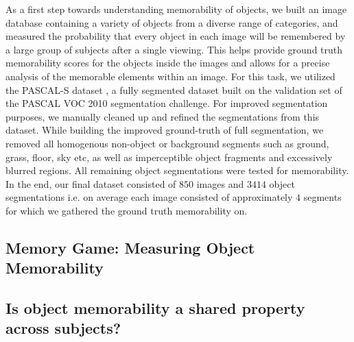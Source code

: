 As a first step towards understanding memorability of objects, we built an image database containing a variety of objects from a diverse range of categories, and measured the probability that every object in each image will be remembered by a large group of subjects after a single viewing. This helps provide ground truth memorability scores for the objects inside the images and allows for a precise analysis of the memorable elements within an image. For this task, we utilized the PASCAL-S dataset \cite{yin14}, a fully segmented dataset built on the validation set of the PASCAL VOC 2010 \cite{pascal10} segmentation challenge. For improved segmentation purposes, we manually cleaned up and refined the segmentations from this dataset. While building the improved ground-truth of full segmentation, we removed all homogenous non-object or background segments such as ground, grass, floor, sky etc, as well as imperceptible object fragments and excessively blurred regions. All remaining object segmentations were tested for memorability. In the end, our final dataset consisted of $850$ images and $3414$ object segmentations i.e. on average each image consisted of approximately $4$ segments for which we gathered the ground truth memorability on.

\subsection{Memory Game: Measuring Object Memorability}


\subsection{Is object memorability a shared property across subjects?}
